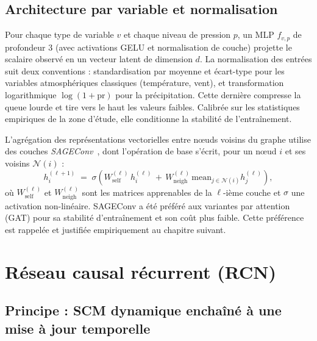 \documentclass[14pt,a4paper,openany]{extreport}
\theoremstyle{definition}
\begin{document}
\subsection{Architecture par variable et normalisation}
\label{ssec:oracle-encoder-archi}

Pour chaque type de variable $v$ et chaque niveau de pression $p$, un MLP $f_{v,p}$ de profondeur 3 (avec activations GELU et normalisation de couche) projette le scalaire observé en un vecteur latent de dimension $d$. La normalisation des entrées suit deux conventions : standardisation par moyenne et écart-type pour les variables atmosphériques classiques (température, vent), et transformation logarithmique $\log(1 + \mathrm{pr})$ pour la précipitation. Cette dernière compresse la queue lourde et tire vers le haut les valeurs faibles. Calibrée sur les statistiques empiriques de la zone d'étude, elle conditionne la stabilité de l'entraînement.

L'agrégation des représentations vectorielles entre nœuds voisins du graphe utilise des couches \emph{SAGEConv}~\cite{hamilton_sage_2017}, dont l'opération de base s'écrit, pour un nœud $i$ et ses voisins $\mathcal{N}(i)$ :
\begin{equation}
  h_i^{(\ell+1)} \;=\; \sigma\!\left( W_{\mathrm{self}}^{(\ell)}\, h_i^{(\ell)} \,+\, W_{\mathrm{neigh}}^{(\ell)}\, \mathrm{mean}_{j \in \mathcal{N}(i)} h_j^{(\ell)} \right),
  \label{eq:sageconv}
\end{equation}
où $W_{\mathrm{self}}^{(\ell)}$ et $W_{\mathrm{neigh}}^{(\ell)}$ sont les matrices apprenables de la $\ell$-ième couche et $\sigma$ une activation non-linéaire. SAGEConv a été préféré aux variantes par attention (GAT) pour sa stabilité d'entraînement et son coût plus faible. Cette préférence est rappelée et justifiée empiriquement au chapitre suivant.

\section{Réseau causal récurrent (RCN)}
\label{sec:oracle-rcn}

\subsection{Principe : SCM dynamique enchaîné à une mise à jour temporelle}
\label{ssec:oracle-rcn-principe}
\end{document}
